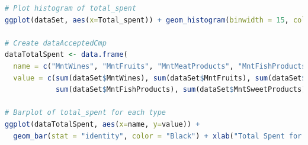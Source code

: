 \documentclass[letterpaper,11pt]{article}
\begin{document}
\begin{lstlisting}[language=R]
# Plot histogram of total_spent
ggplot(dataSet, aes(x=Total_spent)) + geom_histogram(binwidth = 15, colour = "Black")

# Create dataAcceptedCmp
dataTotalSpent <- data.frame(
  name = c("MntWines", "MntFruits", "MntMeatProducts", "MntFishProducts", "MntSweetProducts", "MntGoldProds"),  
  value = c(sum(dataSet$MntWines), sum(dataSet$MntFruits), sum(dataSet$MntMeatProducts),
            sum(dataSet$MntFishProducts), sum(dataSet$MntSweetProducts), sum(dataSet$MntGoldProds)))

# Barplot of total_spent for each type
ggplot(dataTotalSpent, aes(x=name, y=value)) + 
  geom_bar(stat = "identity", color = "Black") + xlab("Total Spent for each type")  
\end{lstlisting}
\end{document}
